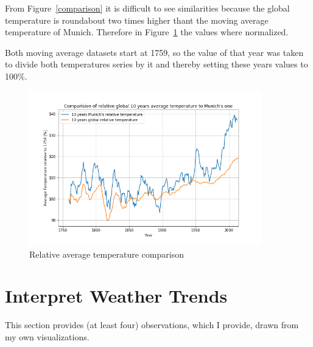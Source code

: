 \documentclass[DIV=11, a4paper, parskip=true]{scrartcl}
\begin{document}
From Figure~\ref{comparison} it is difficult to see similarities because the global temperature
is roundabout two times higher thant the moving average temperature of Munich. Therefore in
Figure~\ref{rel_comparison} the values where normalized.

Both moving average datasets start at 1759, so the value of that year was taken to divide both
temperatures series by it and thereby setting these years values to 100\%.

\begin{figure}[H]
    \centering
    \includegraphics[width=0.9\textwidth]{rel_comparison_average_temperatures.png}
    \caption{Relative average temperature comparison}
    \label{rel_comparison}
\end{figure}

\section{Interpret Weather Trends}

This section provides (at least four) observations, which I provide, drawn from my own
visualizations.
\end{document}
